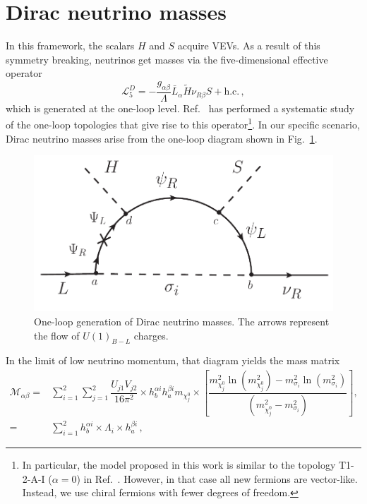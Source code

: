 \documentclass[12pt,letterpaper]{article}
\begin{document}
\section{Dirac neutrino masses}
\label{sec:neutrinos}

In this framework, the scalars $H$ and $S$ acquire VEVs. As a result of this symmetry breaking, neutrinos get masses via the five-dimensional effective operator
\begin{equation}
\label{eq:L5-operator}
\mathcal{L}_5^{D}= -\dfrac{g_{\alpha\beta}}{\Lambda}\bar{L}_{\alpha}\widetilde{H}\nu_{R\beta}S + \text{h.c.}\,,
\end{equation}
which is generated at the one-loop level. Ref.~\cite{Yao:2018ekp} has performed a systematic study of the one-loop topologies that give rise to this operator\footnote{In particular, the model proposed in this work is similar to the topology T1-2-A-I ($\alpha=0$) in Ref.~\cite{Yao:2018ekp}. However, in that case all new fermions are vector-like. Instead, we use chiral fermions with fewer degrees of freedom.}. In our specific scenario, Dirac neutrino masses arise from the one-loop diagram shown in Fig.~\ref{fig:neutrino-GB}.
\begin{figure}[t]
\begin{center}
\includegraphics[scale=0.5]{neutrino-GB.pdf}
\end{center}
\caption{One-loop generation of Dirac neutrino masses. 
The arrows represent the flow of $U(1)_{B-L}$ charges.}
\label{fig:neutrino-GB}
\end{figure}
In the limit of low neutrino momentum, that diagram yields the mass matrix
\begin{align}
\label{eq:neutrino-mij-matrix}
\mathcal{M}_{\alpha\beta}=& \sum_{i=1}^2\sum_{j=1}^2
\dfrac{U_{j1}V_{j2}}{16\pi^2}
\times h_b^{\alpha i} h_a^{\beta i} m_{\chi_j^0} 
\times \left[\dfrac{m_{\chi_j^0}^2 \ln(m_{\chi_j^0}^2) - m_{\sigma_i}^2 \ln(m_{\sigma_i}^2 )}{\left(m_{\chi_j^0}^2-m_{\sigma_i}^2\right)}\right]\nonumber , \\
=&\sum_{i=1}^2
h_b^{\alpha i}\times \Lambda_i\times h_a^{\beta i}\,,
\end{align}
\end{document}
